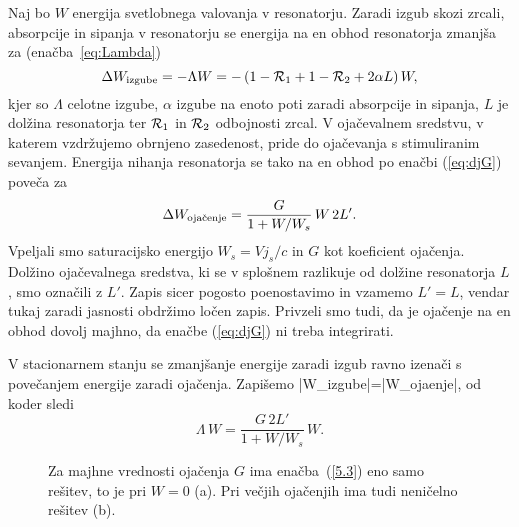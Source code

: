 Naj bo $W$ energija svetlobnega valovanja v resonatorju. Zaradi izgub skozi
zrcali, absorpcije in sipanja v resonatorju se energija na en obhod 
resonatorja zmanjša za (enačba~\ref{eq:Lambda})
\begin{equation}
\Delta W_{\rm izgube}=-\Lambda W=-\left(1-{\cal {R}}_{1}+1-{\cal {R}}_{2}
+2\alpha L\right)W,
\label{5.1}
\end{equation}
kjer so $\Lambda $ celotne izgube, $\alpha$ izgube na enoto poti zaradi
absorpcije in sipanja, $L$ je dolžina resonatorja ter 
${\cal {R}}_{1}$ in ${\cal {R}}_{2}$ odbojnosti
zrcal. V ojačevalnem sredstvu, v katerem vzdržujemo obrnjeno zasedenost,
pride do ojačevanja s stimuliranim sevanjem. Energija nihanja resonatorja 
se tako na en obhod po enačbi (\ref{eq:djG}) poveča za 
\begin{equation}  
\Delta W_{\rm oja\check{c}enje}=\frac{G}{1+W/W_s}\,W\, 2L'.
\label{5.2}
\end{equation}
Vpeljali smo saturacijsko energijo $W_s=Vj_s/c$ in $G$ kot koeficient ojačenja.
Dolžino ojačevalnega sredstva,
ki se v splošnem razlikuje od dolžine resonatorja $L$, smo označili z $L'$.
Zapis sicer pogosto poenostavimo in vzamemo $L'=L$, vendar tukaj zaradi
jasnosti obdržimo ločen zapis. Privzeli smo tudi, da je ojačenje na en
obhod dovolj majhno, da enačbe (\ref{eq:djG}) ni treba integrirati.

V stacionarnem stanju se zmanjšanje energije zaradi izgub ravno izenači 
s povečanjem energije zaradi ojačenja. Zapišemo
\beq
|\Delta W_{\rm izgube}|=|\Delta W_{\rm ojaenje}|,
\eeq
od koder sledi
\begin{equation}  
\Lambda\, W=\frac{G\,2L'}{1+W/W_s}\,W.
\label{5.3}
\end{equation}
\begin{figure}[h]
\centering
\def\svgwidth{140truemm} 

\caption{Za majhne vrednosti ojačenja $G$ ima enačba~(\ref{5.3}) eno samo 
rešitev, to je pri $W=0$ (a). Pri večjih ojačenjih ima tudi neničelno rešitev (b).}
\label{fig:stacio}
\end{figure}

